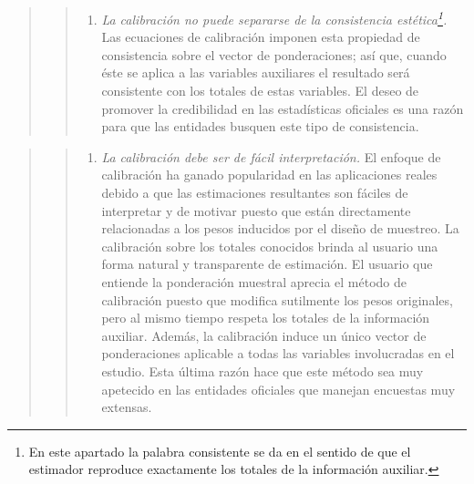 \documentclass[
  12pt,
]{book}
\providecommand{\tightlist}{%
  \setlength{\itemsep}{0pt}\setlength{\parskip}{0pt}}
\begin{document}
\begin{quote}
\begin{quote}
\begin{enumerate}
\def\labelenumi{\arabic{enumi}.}
\setcounter{enumi}{1}
\tightlist
\item
  \emph{La calibración no puede separarse de la consistencia estética\footnote{En este apartado la palabra consistente se da en el sentido de que el estimador reproduce exactamente los totales de la información auxiliar.}.} Las ecuaciones de calibración imponen esta propiedad de consistencia sobre el vector de ponderaciones; así que, cuando éste se aplica a las variables auxiliares el resultado será consistente con los totales de estas variables. El deseo de promover la credibilidad en las estadísticas oficiales es una razón para que las entidades busquen este tipo de consistencia.
\end{enumerate}
\end{quote}
\end{quote}

\begin{quote}
\begin{quote}
\begin{enumerate}
\def\labelenumi{\arabic{enumi}.}
\setcounter{enumi}{2}
\tightlist
\item
  \emph{La calibración debe ser de fácil interpretación.} El enfoque de calibración ha ganado popularidad en las aplicaciones reales debido a que las estimaciones resultantes son fáciles de interpretar y de motivar puesto que están directamente relacionadas a los pesos inducidos por el diseño de muestreo. La calibración sobre los totales conocidos brinda al usuario una forma natural y transparente de estimación. El usuario que entiende la ponderación muestral aprecia el método de calibración puesto que modifica sutilmente los pesos originales, pero al mismo tiempo respeta los totales de la información auxiliar. Además, la calibración induce un único vector de ponderaciones aplicable a todas las variables involucradas en el estudio. Esta última razón hace que este método sea muy apetecido en las entidades oficiales que manejan encuestas muy extensas.
\end{enumerate}
\end{quote}
\end{quote}
\end{document}
